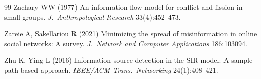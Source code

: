 \documentclass[ijoc,sglanonrev]{informs4}
\begin{document}
\begin{thebibliography}{99}
Zachary WW (1977) An information flow model for conflict and fission in
  small groups. \emph{J.\ Anthropological Research} 33(4):452--473.

Zareie A, Sakellariou R (2021) Minimizing the spread of misinformation in
  online social networks: A survey. \emph{J.\ Network and Computer
  Applications} 186:103094.

Zhu K, Ying L (2016) Information source detection in the SIR model: A
  sample-path-based approach. \emph{IEEE/ACM Trans.\ Networking}
  24(1):408--421.

\end{thebibliography}
\end{document}
